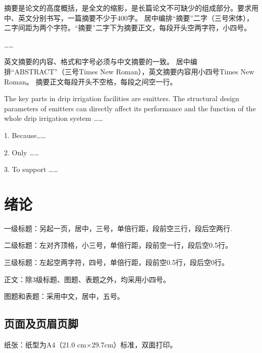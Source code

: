 \documentclass[Mac]{xjtuBSThesis}  %
\author{}{} %
\title{}{}  %
\begin{document}
\frontmatter

\begin{abstractcn} %

摘要是论文的高度概括，是全文的缩影，是长篇论文不可缺少的组成部分。要求用中、英文分别书写，一篇摘要不少于400字。
居中编排“摘要”二字（三号宋体），二字间距为两个字符。“摘要”二字下为摘要正文，每段开头空两字符，小四号。

……


\end{abstractcn}

\keywordscn{} %

\begin{abstracten} %

英文摘要的内容、格式和字号必须与中文摘要的一致。
居中编排“ABSTRACT”（三号Times New Roman），英文摘要内容用小四号Times New Roman。
摘要正文每段开头不空格，每段之间空一行。

The key parts in drip irrigation facilities are emitters. The structural design parameters of emitters can directly affect its performance and the function of the whole drip irrigation system ……

1. Because……

2. Only ……

3. To support ……


\end{abstracten}

\keywordsen{} %
\tableofcontents %

\mainmatter

\section{绪论}
一级标题：另起一页，居中，三号，单倍行距，段前空三行，段后空两行.

二级标题：左对齐顶格，小三号，单倍行距，段前空一行，段后空0.5行。

三级标题：左起空两字符，四号，单倍行距，段前空0.5行，段后空0行。

正文：除3级标题、图题、表题之外，均采用小四号。

图题和表题：采用中文，居中，五号。
\subsection{页面及页眉页脚}
纸张：纸型为A4（21.0 cm×29.7cm）标准，双面打印。
\end{document}
